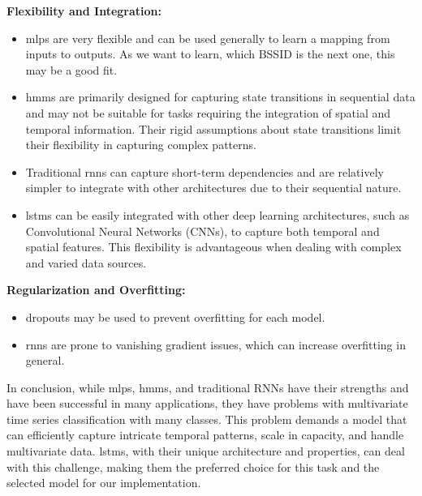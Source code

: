 \textbf{Flexibility and Integration:}
\begin{itemize}
    \item \acp{mlp} are very flexible and can be used generally to learn a mapping from inputs to outputs. \cite{mlp-vs-cnn-vs-rnn} As we want to learn, which BSSID is the next one, this may be a good fit.
    \item \acp{hmm} are primarily designed for capturing state transitions in sequential data and may not be suitable for tasks requiring the integration of spatial and temporal information. Their rigid assumptions about state transitions limit their flexibility in capturing complex patterns. \cite{hmm-rabiner-1989}
    \item Traditional \acp{rnn} can capture short-term dependencies and are relatively simpler to integrate with other architectures due to their sequential nature.
    \item \acp{lstm} can be easily integrated with other deep learning architectures, such as Convolutional Neural Networks (CNNs), to capture both temporal and spatial features. This flexibility is advantageous when dealing with complex and varied data sources.
\end{itemize}

\textbf{Regularization and Overfitting:}
\begin{itemize}
    \item dropouts may be used to prevent overfitting for each model\cite{srivastava14a}.
    \item \acp{rnn} are prone to vanishing gradient issues, which can increase overfitting in general. \cite{rnn_difficulties_2013}
\end{itemize}

In conclusion, while \acp{mlp}, \acp{hmm}, and traditional RNNs have their strengths and have been successful in many applications, they have problems with multivariate time series classification with many classes.
This problem demands a model that can efficiently capture intricate temporal patterns, scale in capacity, and handle multivariate data.
\acp{lstm}, with their unique architecture and properties, can deal with this challenge, making them the preferred choice for this task and the selected model for our implementation.

